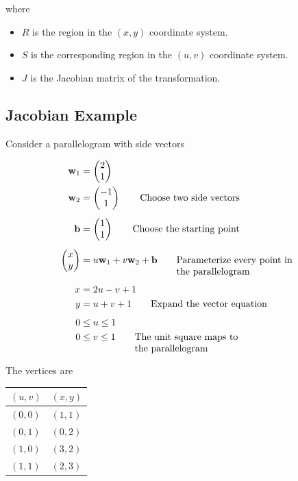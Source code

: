 \documentclass{article}
\newcommand{\justwidth}{0.36\textwidth}
\newcommand{\just}[1]{\parbox[t]{\justwidth}{\raggedright #1}}
\newlength{\defaultparwidth}
\newcommand{\defaultwidthpar}[1]{%
  \par
  \noindent\hfill
  \begin{minipage}{\defaultparwidth}%
  #1%
  \end{minipage}%
  \hfill\null
  \par
}
\begin{document}
\defaultwidthpar{

where

\begin{itemize}
    \item $R$ is the region in the $(x,y)$ coordinate system.
    \item $S$ is the corresponding region in the $(u,v)$ coordinate system.
    \item $J$ is the Jacobian matrix of the transformation.
\end{itemize}

}

\subsection{Jacobian Example}
\defaultwidthpar{Consider a parallelogram with side vectors}

\begin{align*}
\mathbf{w}_1
&=
\begin{pmatrix}
2\\
1
\end{pmatrix}
\\
\mathbf{w}_2
&=
\begin{pmatrix}
-1\\
1
\end{pmatrix}
\tag*{\just{Choose two side vectors}}
\\[0.45em]
\mathbf{b}
&=
\begin{pmatrix}
1\\
1
\end{pmatrix}
\tag*{\just{Choose the starting point}}
\\[0.45em]
\begin{pmatrix}
x\\
y
\end{pmatrix}
&=
u\mathbf{w}_1
+
v\mathbf{w}_2
+
\mathbf{b}
\tag*{\just{Parameterize every point in the parallelogram}}
\\[0.45em]
x
&=
2u-v+1
\\
y
&=
u+v+1
\tag*{\just{Expand the vector equation}}
\\[0.45em]
0
&\leq
u
\leq
1
\\
0
&\leq
v
\leq
1
\tag*{\just{The unit square maps to the parallelogram}}
\end{align*}

\defaultwidthpar{

The vertices are

\begin{tabularx}{1\textwidth} {| >{\raggedright\arraybackslash}X | >{\raggedright\arraybackslash}X |}
\hline
$(u,v)$ & $(x,y)$ \\
\hline
$(0,0)$ & $(1,1)$ \\
\hline
$(0,1)$ & $(0,2)$ \\
\hline
$(1,0)$ & $(3,2)$ \\
\hline
$(1,1)$ & $(2,3)$ \\
\hline
\end{tabularx}
}
\end{document}
